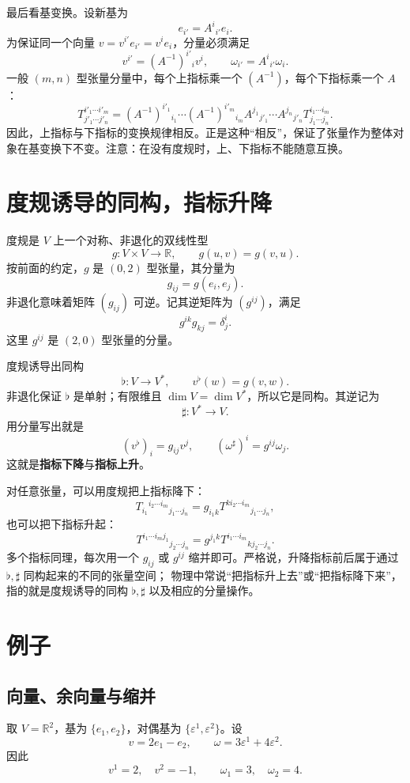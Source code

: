 \documentclass[UTF8,11pt,a4paper,fontset=fandol]{ctexart}
\numberwithin{equation}{section}
\newcommand{\R}{\mathbb R}
\newcommand{\eps}{\varepsilon}
\begin{document}
最后看基变换。设新基为
\[
e_{i'}=A^i{}_{i'}e_i.
\]
为保证同一个向量 $v=v^{i'}e_{i'}=v^i e_i$，分量必须满足
\[
v^{i'}=(A^{-1})^{i'}{}_i v^i,\qquad
\omega_{i'}=A^i{}_{i'}\omega_i.
\]
一般 $(m,n)$ 型张量分量中，每个上指标乘一个 $(A^{-1})$，每个下指标乘一个 $A$：
\[
T^{i'_1\cdots i'_m}_{j'_1\cdots j'_n}
=
(A^{-1})^{i'_1}{}_{i_1}\cdots (A^{-1})^{i'_m}{}_{i_m}
A^{j_1}{}_{j'_1}\cdots A^{j_n}{}_{j'_n}
T^{i_1\cdots i_m}_{j_1\cdots j_n}.
\]
因此，上指标与下指标的变换规律相反。正是这种“相反”，保证了张量作为整体对象在基变换下不变。注意：在没有度规时，上、下指标不能随意互换。

\section{度规诱导的同构，指标升降}

度规是 $V$ 上一个对称、非退化的双线性型
\[
g:V\times V\to\R,\qquad g(u,v)=g(v,u).
\]
按前面的约定，$g$ 是 $(0,2)$ 型张量，其分量为
\[
g_{ij}=g(e_i,e_j).
\]
非退化意味着矩阵 $(g_{ij})$ 可逆。记其逆矩阵为 $(g^{ij})$，满足
\[
g^{ik}g_{kj}=\delta^i_j.
\]
这里 $g^{ij}$ 是 $(2,0)$ 型张量的分量。

度规诱导出同构
\[
\flat:V\longrightarrow V^*,\qquad v^\flat(w)=g(v,w).
\]
非退化保证 $\flat$ 是单射；有限维且 $\dim V=\dim V^*$，所以它是同构。其逆记为
\[
\sharp:V^*\longrightarrow V.
\]
用分量写出就是
\[
(v^\flat)_i=g_{ij}v^j,\qquad
(\omega^\sharp)^i=g^{ij}\omega_j.
\]
这就是\textbf{指标下降}与\textbf{指标上升}。

对任意张量，可以用度规把上指标降下：
\[
T_{i_1}{}^{i_2\cdots i_m}{}_{j_1\cdots j_n}
=
g_{i_1 k}T^{k i_2\cdots i_m}{}_{j_1\cdots j_n},
\]
也可以把下指标升起：
\[
T^{i_1\cdots i_m j_1}{}_{j_2\cdots j_n}
=
g^{j_1 k}T^{i_1\cdots i_m}{}_{k j_2\cdots j_n}.
\]
多个指标同理，每次用一个 $g_{ij}$ 或 $g^{ij}$ 缩并即可。严格说，升降指标前后属于通过 $\flat,\sharp$ 同构起来的不同的张量空间；
物理中常说“把指标升上去”或“把指标降下来”，指的就是度规诱导的同构 $\flat,\sharp$ 以及相应的分量操作。
\section{例子}
\subsection{向量、余向量与缩并}

取 $V=\R^2$，基为 $\{e_1,e_2\}$，对偶基为
$\{\eps^1,\eps^2\}$。设
\[
v=2e_1-e_2,
\qquad
\omega=3\eps^1+4\eps^2.
\]
因此
\[
v^1=2,\quad v^2=-1,
\qquad
\omega_1=3,\quad \omega_2=4.
\]
\end{document}
